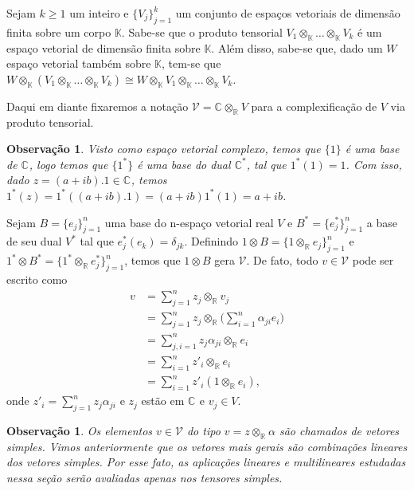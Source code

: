\documentclass[12pt]{book}
\newtheorem{observacao}[teorema]{Observação}
\newcommand{\bigparenteses}[1]{\Big( #1 \Big) }
\newcommand{\colecaofinita}[2]{\{#1_{j} \}_{j=1}^{#2}}
\newcommand{\complexificacaotensorial}[1]{\complexo{}\otimes_{\reta} #1}
\newcommand{\complexificado}[1]{\mathcal{#1}}
\newcommand{\complexificacaoelemento}[2]{#1\otimes_{\reta} #2}
\newcommand{\complexo}[1]{\mathbb{C}^{#1}}
\newcommand{\produtotensorial}[2]{ #1_{1} \otimes_{\mathbb{K}} \dots \otimes_{\mathbb{K}} #1_{#2}}
\newcommand{\real}[1]{\mathbb{R}^{#1}}
\newcommand{\reta}{\real{}}
\begin{document}
	Sejam $k\geq 1$ um inteiro e $\{V_{j}\}_{j=1}^{k}$ um conjunto de espaços vetoriais de dimensão finita sobre um corpo $\mathbb{K}$. Sabe-se que o produto tensorial $\produtotensorial{V}{k}$ é um espaço vetorial de dimensão finita sobre $\mathbb{K}$. Além disso, sabe-se que, dado um $W$ espaço vetorial também sobre $\mathbb{K}$, tem-se que $W\otimes_{\mathbb{K}}(\produtotensorial{V}{k}) \cong W\otimes_{\mathbb{K}} \produtotensorial{V}{k}$. 
	
	Daqui em diante fixaremos a notação $\complexificado{V} = \complexificacaotensorial{V}$ para a complexificação de $V$ via produto tensorial.
	
	\begin{observacao}
		Visto como espaço vetorial complexo, temos que $\{1\}$ é uma base de $\complexo{}$, logo temos que $\{1^{*}\}$ é uma base do dual $\complexo{*}$, tal que $1^{*}(1) = 1$. Com isso, dado $z = (a+ib).1 \in \complexo{}$, temos $1^{*}(z) = 1^{*}((a+ib).1) = (a+ib)1^{*}(1) = a+ib$.
	\end{observacao}
	
	Sejam $B = \colecaofinita{e}{n}$ uma base do n-espaço vetorial real $V$ e $B^{*} = \colecaofinita{e^{*}}{n}$ a base de seu dual $V^{*}$ tal que $e^{*}_{j}(e_{k}) =\delta_{jk}$. Definindo $1 \otimes B = \colecaofinita{\complexificacaoelemento{1}{e}}{n}$ e
	$1^{*} \otimes B^{*} = \colecaofinita{\complexificacaoelemento{1^{*}}{e^{*}}}{n}$, temos que $1\otimes B$ gera $\complexificado{V}$. De fato, todo $v \in \complexificado{V}$ pode ser escrito como 
	$$
	\begin{aligned}
	v &= \sum_{j=1}^{n} \complexificacaoelemento{z_{j}}{v_{j}}
	\\
	&= \sum_{j=1}^{n} \complexificacaoelemento{z_{j}}{\bigparenteses{\sum_{i=1}^{n}\alpha_{ji}e_{i}}} 
	\\
	&= \sum_{j,i=1}^{n}\complexificacaoelemento{z_{j}\alpha_{ji}}{e_{i}}
	\\
	&= \sum_{i=1}^{n}\complexificacaoelemento{z'_{i}}{e_{i}}
	\\
	&= \sum_{i=1}^{n}z'_{i}(\complexificacaoelemento{1}{e_{i}}),
	\end{aligned}
	$$
	onde $z'_{i} = \sum_{j=1}^{n}z_{j}\alpha_{ji}$ e $ z_{j}$ estão em $\complexo{}$ e $v_{j} \in V$.
	
	
	\begin{observacao}
		Os elementos $v \in \complexificado{V}$ do tipo $v = \complexificacaoelemento{z}{\alpha}$ são chamados de vetores simples. Vimos anteriormente que os vetores mais gerais são combinações lineares dos vetores simples. Por esse fato, as aplicações lineares e multilineares estudadas nessa seção serão avaliadas apenas nos tensores simples.
	\end{observacao}
	
\end{document}
